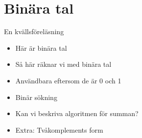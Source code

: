 \section*{Binära tal}
En kvällsföreläsning
\begin{itemize}
	\item Här är binära tal
	\item Så här räknar vi med binära tal
	\item Användbara eftersom de är 0 och 1
	\item Binär sökning
	\item Kan vi beskriva algoritmen för summan?
	\item Extra: Tvåkomplements form
\end{itemize}
